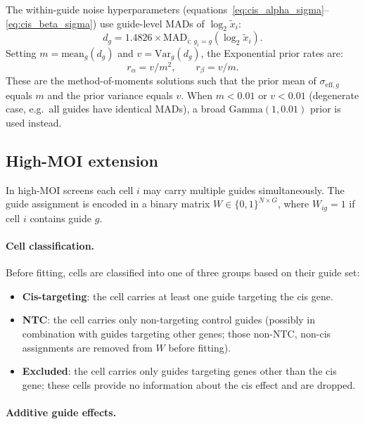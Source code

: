 \documentclass[12pt]{article}
\begin{document}
The within-guide noise hyperparameters (equations~\ref{eq:cis_alpha_sigma}--\ref{eq:cis_beta_sigma})
use guide-level MADs of $\log_2\tilde x_i$:
\begin{equation}
  d_g = 1.4826\times\mathrm{MAD}_{i:\,g_i=g}\!\left(\log_2 \tilde x_i\right).
\end{equation}
Setting $m = \mathrm{mean}_g(d_g)$ and $v = \mathrm{Var}_g(d_g)$, the Exponential
prior rates are:
\begin{equation}
  r_\alpha = v/m^2, \qquad r_\beta = v/m.
  \label{eq:cis_r_alphabeta}
\end{equation}
These are the method-of-moments solutions such that the prior mean of
$\sigma_{\mathrm{eff},g}$ equals $m$ and the prior variance equals $v$.
When $m < 0.01$ or $v < 0.01$ (degenerate case, e.g.\ all guides have identical MADs),
a broad $\mathrm{Gamma}(1, 0.01)$ prior is used instead.

\subsection{High-MOI extension}
\label{sec:highmoi}

In high-MOI screens each cell $i$ may carry multiple guides simultaneously.
The guide assignment is encoded in a binary matrix $W \in \{0,1\}^{N \times G}$,
where $W_{ig} = 1$ if cell $i$ contains guide $g$.

\paragraph{Cell classification.}

Before fitting, cells are classified into one of three groups based on their guide set:
\begin{itemize}
  \item \textbf{Cis-targeting}: the cell carries at least one guide targeting the cis gene.
  \item \textbf{NTC}: the cell carries only non-targeting control guides (possibly in
        combination with guides targeting other genes; those non-NTC, non-cis assignments
        are removed from $W$ before fitting).
  \item \textbf{Excluded}: the cell carries only guides targeting genes other than the
        cis gene; these cells provide no information about the cis effect and are dropped.
\end{itemize}

\paragraph{Additive guide effects.}
\end{document}
